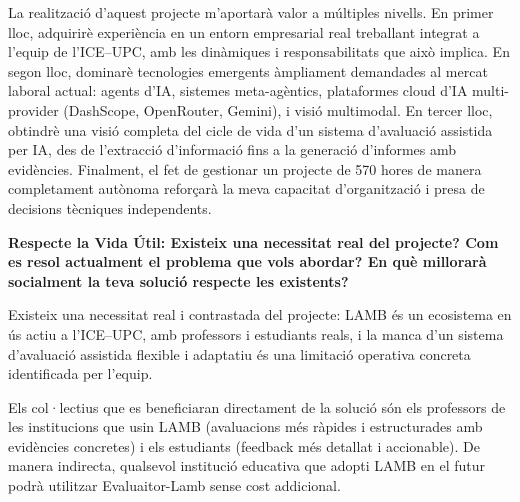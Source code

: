 \documentclass[12pt,a4paper,twoside]{report}
\begin{document}
La realitzaci\'o d'aquest projecte m'aportar\`a valor a m\'ultiples nivells. En primer lloc, adquirir\`e experi\`encia en un entorn empresarial real treballant integrat a l'equip de l'ICE--UPC, amb les din\`amiques i responsabilitats que aix\`o implica. En segon lloc, dominar\`e tecnologies emergents \`ampliament demandades al mercat laboral actual: agents d'IA, sistemes meta-ag\`entics, plataformes cloud d'IA multi-provider (DashScope, OpenRouter, Gemini), i visi\'o multimodal. En tercer lloc, obtindr\`e una visi\'o completa del cicle de vida d'un sistema d'avaluaci\'o assistida per IA, des de l'extracci\'o d'informaci\'o fins a la generaci\'o d'informes amb evid\`encies. Finalment, el fet de gestionar un projecte de 570 hores de manera completament aut\`onoma refor\c{c}ar\`a la meva capacitat d'organitzaci\'o i presa de decisions t\`ecniques independents.

\textbf{Respecte la Vida \'Util: Existeix una necessitat real del projecte? Com es resol actualment el problema que vols abordar? En qu\`e millorar\`a socialment la teva soluci\'o respecte les existents?}

Existeix una necessitat real i contrastada del projecte: LAMB \'es un ecosistema en \'us actiu a l'ICE--UPC, amb professors i estudiants reals, i la manca d'un sistema d'avaluaci\'o assistida flexible i adaptatiu \'es una limitaci\'o operativa concreta identificada per l'equip.

Els col·lectius que es beneficiaran directament de la soluci\'o s\'on els professors de les institucions que usin LAMB (avaluacions m\'es r\`apides i estructurades amb evid\`encies concretes) i els estudiants (feedback m\'es detallat i accionable). De manera indirecta, qualsevol instituci\'o educativa que adopti LAMB en el futur podr\`a utilitzar Evaluaitor-Lamb sense cost addicional.
\end{document}
